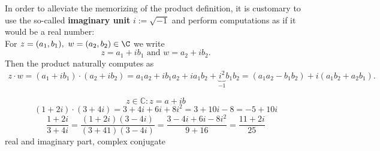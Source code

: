 \begin{frame}
In order to alleviate the memorizing of the product definition, it is customary to use the so-called \textbf{\color{defgruen} imaginary unit} $i:=\sqrt{-1}$ and perform computations as if it would be a real number: \\
\vspace{0.3cm}
{\color{defgruen}For $z = (a_1, b_1),~w=(a_2, b_2) \in \C$ we write $$z = a_1 +ib_1\text{ and }w = a_2 +ib_2.$$}
Then the product naturally computes as
\begin{align*}
z\cdot w = (a_1 +ib_1)\cdot(a_2+ib_2)
=a_1a_2+ib_1a_2+ia_1b_2+\underbrace{i^2}_{-1}b_1b_2 
={(a_1a_2-b_1b_2)} + i{(a_1b_2+a_2b_1)}.
\end{align*}
\begin{ex}
	\blank
	\begin{equation*}
	z \in \mathbb{C} : z = a + ib
	\end{equation*}
	\begin{equation*}
	(1+2i)\cdot(3+4i) =3+4i+6i+8i^2 = 3+10i-8=-5+10i
	\end{equation*}
	\begin{equation*}
	\frac{1+2i}{3+4i} = \frac{(1+2i)(3-4i)}{(3+41)(3-4i)} = \frac{3-4i+6i-8i^2}{9+16} = \frac{11+2i}{25}
	\end{equation*}
	real and imaginary part, complex conjugate
\end{ex}
\end{frame}



